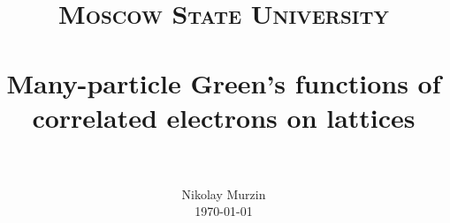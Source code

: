 \title{
  \vspace{-1in}
  \normalfont \normalsize \textsc{Moscow State University} \\ [25pt]
  \horrule{0.5pt} \\[0.4cm]
  \huge Many-particle Green's functions of correlated electrons on lattices \\
  \horrule{2pt} \\[0.5cm]
}
\author{
  \normalfont
  \normalsize
  {Nikolay Murzin}\\[-3pt]  
  \normalsize
  \today
}
\date{}